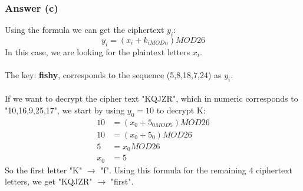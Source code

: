 \documentclass{article}
\begin{document}
	\subsubsection*{Answer (c)}
	Using the formula we can get the ciphertext $y_i$:
	$$
	y_i = (x_i + k_{i MOD n}) MOD 26
	$$
	In this case, we are looking for the plaintext letters $x_i$.
	\\\\
	The key: \textbf{fishy}, corresponds to the sequence (5,8,18,7,24) as $y_i$. 
	\\\\
	If we want to decrypt the cipher text "KQJZR", which in numeric corresponds to "10,16,9,25,17", we start by using $y_0 = 10$ to decrypt K:
	\[
	\begin{split}
	10 	&= (x_0 + 5_{0 MOD 5}) MOD 26 \\
	10	&= (x_0 + 5_0) MOD 26 \\
	5	&= x_0 MOD 26 \\
	x_0 &= 5
	\end{split}
	\]
	So the first letter "K" $\rightarrow$ "f". Using this formula for the remaining 4 ciphertext letters, we get "KQJZR" $\rightarrow$ "first".
	
	
\end{document}
